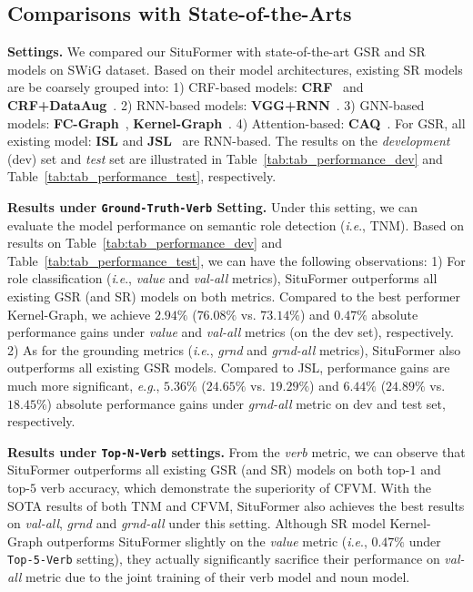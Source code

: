 \documentclass[letterpaper]{article} %
\newcommand{\ie}{\textit{i}.\textit{e}.}
\newcommand{\eg}{\textit{e}.\textit{g}.}
\begin{document}
\subsection{Comparisons with State-of-the-Arts}
\noindent\textbf{Settings.} We compared our SituFormer with state-of-the-art GSR and SR models on SWiG dataset. Based on their model architectures, existing SR models are be coarsely grouped into: 1) CRF-based models: \textbf{CRF}~\cite{yatskar2016situation} and \textbf{CRF+DataAug}~\cite{yatskar2017commonly}. 2) RNN-based models: \textbf{VGG+RNN}~\cite{mallya2017recurrent}. 3) GNN-based models: \textbf{FC-Graph}~\cite{li2017situation}, \textbf{Kernel-Graph}~\cite{suhail2019mixture}. 4) Attention-based: \textbf{CAQ}~\cite{9156513}. For GSR, all existing model: \textbf{ISL} and \textbf{JSL}~\cite{pratt2020grounded} are RNN-based. The results on the \textit{development} (dev) set and \emph{test} set are illustrated in Table~\ref{tab:tab_performance_dev} and Table~\ref{tab:tab_performance_test}, respectively.


\noindent\textbf{Results under \texttt{Ground-Truth-Verb} Setting.} Under this setting, we can evaluate the model performance on semantic role detection (\ie, TNM). Based on results on Table~\ref{tab:tab_performance_dev} and Table~\ref{tab:tab_performance_test}, we can have the following observations: 1) For role classification (\ie, \emph{value} and \emph{val-all} metrics), SituFormer outperforms all existing GSR (and SR) models on both metrics. Compared to the best performer Kernel-Graph, we achieve $2.94\%$ ($76.08\%$ vs. $73.14\%$) and $0.47\%$ absolute performance gains under \emph{value} and \emph{val-all} metrics (on the dev set), respectively. 2) As for the grounding metrics (\ie, \emph{grnd} and \emph{grnd-all} metrics), SituFormer also outperforms all existing GSR models. Compared to JSL, performance gains are much more significant, \eg, $5.36\%$ ($24.65\%$ vs. $19.29\%$) and $6.44\%$ ($24.89\%$ vs. $18.45\%$) absolute performance gains under \emph{grnd-all} metric on dev and test set, respectively.


\noindent\textbf{Results under \texttt{Top-N-Verb} settings.} From the \emph{verb} metric, we can observe that SituFormer outperforms all existing GSR (and SR) models on both top-$1$ and top-$5$ verb accuracy, which demonstrate the superiority of CFVM. With the SOTA results of both TNM and CFVM, SituFormer also achieves the best results on \emph{val-all}, \emph{grnd} and \emph{grnd-all} under this setting. Although SR model Kernel-Graph outperforms SituFormer slightly on the \textit{value} metric (\ie, $0.47\%$ under \texttt{Top-5-Verb} setting), they actually significantly sacrifice their performance on \textit{val-all} metric due to the joint training of their verb model and noun model.
\end{document}
